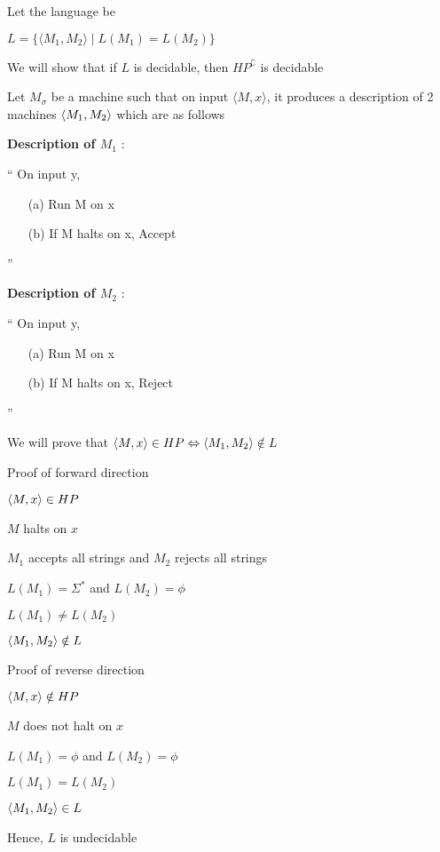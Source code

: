 Let the language be 

$L = \{\langle M_1, M_2 \rangle \mid L(M_1) = L(M_2)\}$

We will show that if $L$ is decidable, then $HP^\complement$ is decidable

Let $M_\sigma$ be a machine such that on input $\langle M, x \rangle$, it produces a description of 2 machines $\langle M_1, M_2 \rangle$ which are as follows

\textbf{Description of $M_1$} :

``
On input y,
\begin{enumerate}
    \item[(a)] Run M on x
    \item[(b)] If M halts on x, Accept
\end{enumerate}
''

\textbf{Description of $M_2$} :

``
On input y,
\begin{enumerate}
    \item[(a)] Run M on x
    \item[(b)] If M halts on x, Reject
\end{enumerate}
''

We will prove that $\langle M, x \rangle \in HP \Leftrightarrow \langle M_1, M_2 \rangle \notin L$

Proof of forward direction

$\langle M, x \rangle \in HP$

\imp
$M$ halts on $x$

\imp
$M_1$ accepts all strings and $M_2$ rejects all strings

\imp
$L(M_1) = \Sigma ^ *$ and $L(M_2) = \phi$

\imp
$L(M_1) \neq L(M_2)$

\imp
$\langle M_1, M_2 \rangle \notin L$

Proof of reverse direction

$\langle M, x \rangle \notin HP$

\imp
$M$ does not halt on $x$

\imp
$L(M_1) = \phi$ and $L(M_2) = \phi$

\imp
$L(M_1) = L(M_2)$

\imp
$\langle M_1, M_2 \rangle \in L$


Hence, $L$ is undecidable











